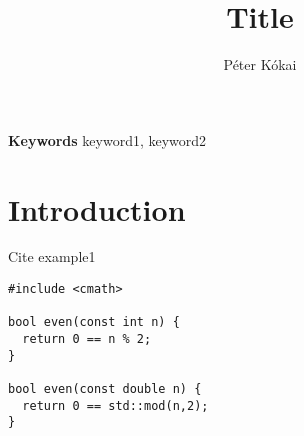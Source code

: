 \documentclass[a4paper, 10pt, conference ]{llncs}
\title{\LARGE \bf
Title
}
\author{P\'eter K\'okai}
\institute{E\"ot\"ovs Lor\'and University}
\let\cite\parencite
\begin{document}
\maketitle
\thispagestyle{empty}
\pagestyle{empty}



\small \textbf{Keywords} keyword1, keyword2

\section{Introduction}


Cite example1\cite{igarashi2005lightweight}\cite{scala-graph-family-poly-example}

\begin{verbatim}
#include <cmath>

bool even(const int n) {
  return 0 == n % 2;
}

bool even(const double n) {
  return 0 == std::mod(n,2);
}
\end{verbatim}



\printbibliography
\end{document}
